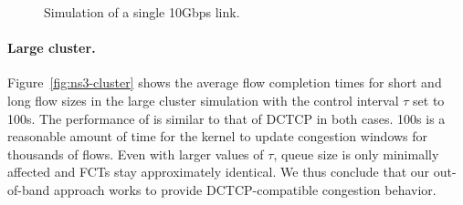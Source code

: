 \begin{figure}
  \vspace{-1.8ex}
  \centering
  \hspace*{-0.25cm}
  \caption{Simulation of a single 10Gbps link.}
  \label{fig:ns3-link}
\end{figure}

\paragraph{Large cluster.} Figure~\ref{fig:ns3-cluster} shows the
average flow completion times for short and long flow sizes in the
large cluster simulation with the control interval $\tau$ set to
100\textmu s. The performance of \rmttcp is similar to that of DCTCP
in both cases. 100\textmu s is a reasonable amount of time for the
kernel to update congestion windows for thousands of flows. Even with
larger values of $\tau$, queue size is only minimally affected and
FCTs stay approximately identical. We thus conclude that our
out-of-band approach works to provide DCTCP-compatible congestion
behavior.


